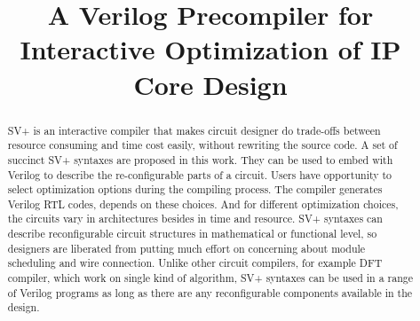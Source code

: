 \documentclass{sig-alternate}
\begin{document}
\title{A Verilog Precompiler for Interactive Optimization of IP Core Design}
\maketitle
\begin{abstract}
SV+ is an interactive compiler that makes circuit designer do trade-offs 
between resource consuming and time cost easily, without rewriting the 
source code. A set of succinct SV+ syntaxes are proposed in this work. 
They can be used to embed with Verilog to describe the 
re-configurable parts of a circuit. Users have opportunity to select 
optimization options during the compiling process. The compiler 
generates Verilog RTL codes, depends on these choices. And for different
 optimization choices, the circuits vary in architectures besides 
in time and resource. SV+ syntaxes can describe reconfigurable circuit
 structures in mathematical or functional level, so designers are 
liberated from putting much effort on concerning about module scheduling
 and wire connection. Unlike other circuit compilers, for example DFT 
compiler\cite{GNordin:FFT}, which work on single kind of algorithm,
 SV+ syntaxes can be used in a range of Verilog programs as long as 
there are any reconfigurable components available in the design.
\end{abstract}










\newpage
\appendix

\end{document}
